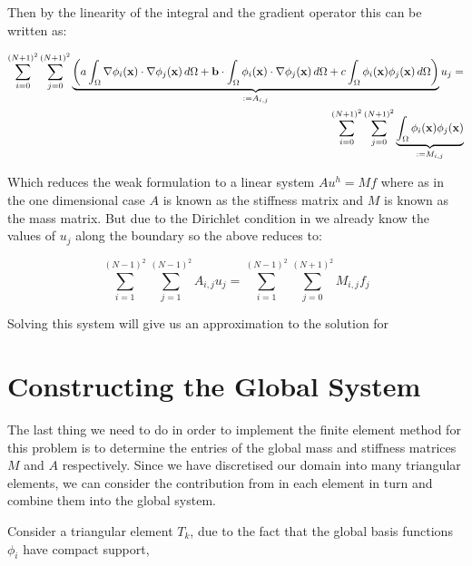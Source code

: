 Then by the linearity of the integral and the gradient operator this can be
written as:

\begin{align}\label{eq:twod-deterministic-discrete}
  \begin{split}
	\sum_{i=0}^{(N+1)^2}\sum_{j=0}^{(N+1)^2}
      \underbrace{\left(
         a\int_{\Omega}\nabla\phi_i(\mathbf{x})\cdot\nabla\phi_j(\mathbf{x})\, d\Omega
         + \mathbf{b}\cdot\int_{\Omega}\phi_i(\mathbf{x})\cdot\nabla\phi_j(\mathbf{x})\, d\Omega
         +c\int_{\Omega}\phi_i(\mathbf{x})\phi_j(\mathbf{x})\, d\Omega
      \right)}_{:= A_{i,j}}u_j = \\
    \sum_{i=0}^{(N + 1)^2}\sum_{j=0}^{(N + 1)^2}
      \underbrace{\int_{\Omega}\phi_i(\mathbf{x})\phi_j(\mathbf{x})}_{:= M_{i,j}}
  \end{split}
\end{align}

Which reduces the weak formulation  to a linear
system $Au^h = Mf$ where as in the one dimensional case $A$ is known as
the stiffness matrix and $M$ is known as the mass matrix. But due to the Dirichlet
condition in  we already know the values of $u_j$
along the boundary so the above reduces to:

\begin{equation}
	\sum_{i = 1}^{(N-1)^2}\sum_{j=1}^{(N-1)^2}A_{i,j}u_j =
    \sum_{i=1}^{(N-1)^2}\sum_{j=0}^{(N+1)^2}M_{i,j}f_j
\end{equation}

Solving this system will give us an approximation to the solution for

\section{Constructing the Global System}

The last thing we need to do in order to implement the finite element method
for this problem is to determine the entries of the global mass and stiffness
matrices $M$ and $A$ respectively. Since we have discretised our domain into
many triangular elements, we can consider the contribution from in each element
in turn and combine them into the global system.

Consider a triangular element $T_k$, due to the fact that the global basis
functions $\phi_i$ have compact support,


